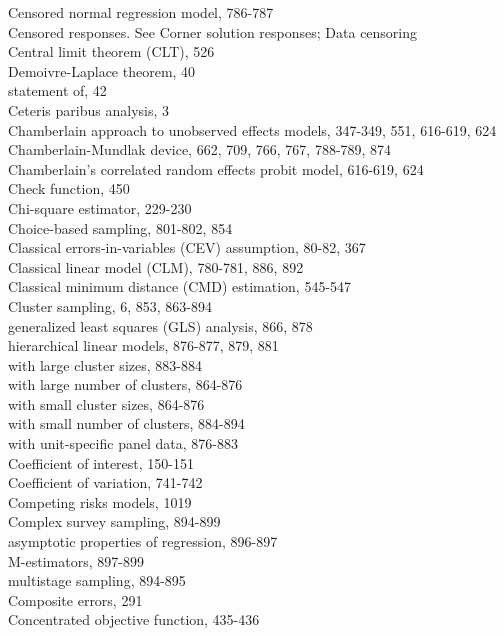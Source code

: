\documentclass[10pt]{article}
\begin{document}
Censored normal regression model, 786-787\\
Censored responses. See Corner solution responses; Data censoring\\
Central limit theorem (CLT), 526\\
Demoivre-Laplace theorem, 40\\
statement of, 42\\
Ceteris paribus analysis, 3\\
Chamberlain approach to unobserved effects models, 347-349, 551, 616-619, 624\\
Chamberlain-Mundlak device, 662, 709, 766, 767, 788-789, 874\\
Chamberlain's correlated random effects probit model, 616-619, 624\\
Check function, 450\\
Chi-square estimator, 229-230\\
Choice-based sampling, 801-802, 854\\
Classical errors-in-variables (CEV) assumption, 80-82, 367\\
Classical linear model (CLM), 780-781, 886, 892\\
Classical minimum distance (CMD) estimation, 545-547\\
Cluster sampling, 6, 853, 863-894\\
generalized least squares (GLS) analysis, 866, 878\\
hierarchical linear models, 876-877, 879, 881\\
with large cluster sizes, 883-884\\
with large number of clusters, 864-876\\
with small cluster sizes, 864-876\\
with small number of clusters, 884-894\\
with unit-specific panel data, 876-883\\
Coefficient of interest, 150-151\\
Coefficient of variation, 741-742\\
Competing risks models, 1019\\
Complex survey sampling, 894-899\\
asymptotic properties of regression, 896-897\\
M-estimators, 897-899\\
multistage sampling, 894-895\\
Composite errors, 291\\
Concentrated objective function, 435-436\\
\end{document}
